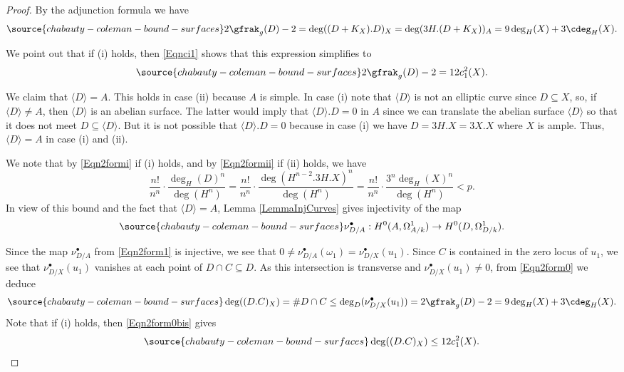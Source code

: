 \begin{proof}
By the adjunction formula we have
\begin{equation}\label{Eqn2form0}
\source{chabauty-coleman-bound-surfaces}
2\gfrak_g(D)-2 = \deg ((D+K_X).D)_X = \deg (3H.(D+K_X))_A = 9\deg_H(X) + 3\cdeg_H(X).
\end{equation}


We point out that if (i) holds, then \eqref{Eqnci1}  shows that this expression simplifies to
\begin{equation}\label{Eqn2form0bis}
\source{chabauty-coleman-bound-surfaces}
2\gfrak_g(D)-2 = 12c_1^2(X).
\end{equation}




We claim that $\langle D\rangle =A$. This holds in case (ii) because $A$ is simple. In case (i) note that $\langle D\rangle$ is not an elliptic curve since $D\subseteq X$, so, if $\langle D\rangle \ne A$, then $\langle D\rangle$ is an abelian surface. The latter would imply that $\langle D\rangle . D=0$ in $A$ since we can translate the abelian surface $\langle D\rangle$ so that it does not meet $D\subseteq\langle D\rangle$. But it is not possible that $\langle D\rangle . D=0$ because in case (i) we have $D=3H.X=3X.X$ where $X$ is ample. Thus, $\langle D\rangle =A$ in case (i) and (ii).

We note that by \eqref{Eqn2formi} if (i) holds, and by \eqref{Eqn2formii} if (ii) holds, we have
$$
\frac{n!}{n^n}\cdot \frac{\deg_H(D)^n}{\deg (H^n)}=\frac{n!}{n^n}\cdot \frac{\deg(H^{n-2}.3H.X)^n}{\deg (H^n)}=\frac{n! }{n^n}\cdot \frac{3^n\deg_H(X)^n}{\deg (H^n)}<p.
$$
In view of this bound and the fact that $\langle D\rangle =A$, Lemma \ref{LemmaInjCurves} gives injectivity of the map
\begin{equation}\label{Eqn2form1}
\source{chabauty-coleman-bound-surfaces}
\nu_{D/A}^\bullet : H^0(A,\Omega^1_{A/k})\to H^0(D,\Omega^1_{D/k}).
\end{equation}








Since the map $\nu_{D/A}^\bullet$ from \eqref{Eqn2form1} is injective, we see that $0\ne \nu_{D/A}^\bullet(\omega_1) = \nu_{D/X}^\bullet(u_1)$. Since $C$ is contained in the zero locus of $u_1$, we see that $\nu_{D/X}^\bullet(u_1)$ vanishes at each point of $D\cap C\subseteq D$.  As this intersection is transverse and $\nu_{D/X}^\bullet(u_1)\ne 0$, from \eqref{Eqn2form0} we deduce
\begin{equation}\label{EqnBdInt1}
\source{chabauty-coleman-bound-surfaces}
\deg((D.C)_X)=\# D\cap C\le \deg_D( \nu_{D/X}^\bullet(u_1))=2\gfrak_g(D)-2=9\deg_H(X) + 3\cdeg_H(X).
\end{equation}
Note that if (i) holds, then \eqref{Eqn2form0bis} gives
\begin{equation}\label{EqnBdInt2}
\source{chabauty-coleman-bound-surfaces}
\deg((D.C)_X)\le 12 c_1^2(X).
\end{equation}







\end{proof}
